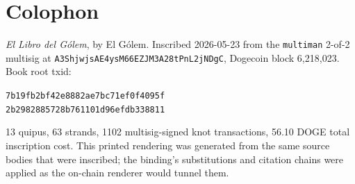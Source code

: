 \documentclass[11pt,openany]{book}
\begin{document}
\clearpage
\chapter*{Colophon}

\noindent
\textit{El Libro del G\'olem}, by El G\'olem. Inscribed 2026-05-23 from
the \texttt{multiman} 2-of-2 multisig at
\texttt{A3ShjwjsAE4ysM66EZJM3A28tPnL2jNDgC}, Dogecoin block 6{,}218{,}023.
Book root txid:

\smallskip
\noindent\small\texttt{7b19fb2bf42e8882ae7bc71ef0f4095f}\\
\noindent\texttt{2b2982885728b761101d96efdb338811}

\medskip
\noindent\normalsize
13 quipus, 63 strands, 1102 multisig-signed knot transactions, 56.10 DOGE total
inscription cost. This printed rendering was generated from the same source
bodies that were inscribed; the binding's substitutions and citation chains
were applied as the on-chain renderer would tunnel them.
\end{document}

